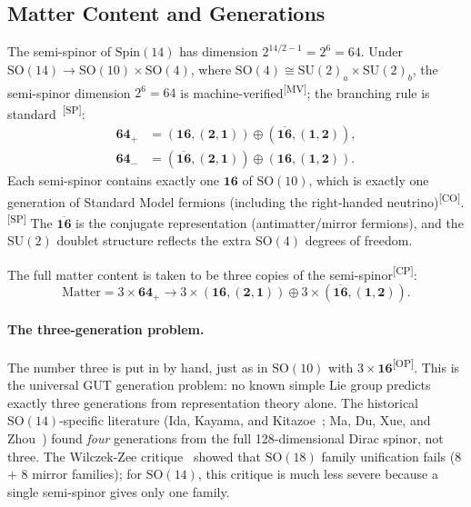 \documentclass[aps,prd,twocolumn,showpacs,preprintnumbers,superscriptaddress,floatfix]{revtex4-2}
\newcommand{\MV}{\textsuperscript{[MV]}}
\newcommand{\CO}{\textsuperscript{[CO]}}
\newcommand{\CP}{\textsuperscript{[CP]}}
\newcommand{\SP}{\textsuperscript{[SP]}}
\newcommand{\OP}{\textsuperscript{[OP]}}
\begin{document}
\subsection{Matter Content and Generations}
\label{sec:matter}

The semi-spinor of $\mathrm{Spin}(14)$ has dimension
$2^{14/2-1} = 2^6 = 64$.  Under $\mathrm{SO}(14) \to \mathrm{SO}(10)
\times \mathrm{SO}(4)$, where $\mathrm{SO}(4) \cong \mathrm{SU}(2)_a
\times \mathrm{SU}(2)_b$, the semi-spinor dimension
$2^6 = 64$ is machine-verified\MV; the branching rule is
standard~\cite{slansky1981}\SP:
\begin{align}\label{eq:64}
  \mathbf{64}_+ &= (\mathbf{16}, (\mathbf{2}, \mathbf{1}))
    \oplus (\overline{\mathbf{16}}, (\mathbf{1}, \mathbf{2})), \\
  \mathbf{64}_- &= (\overline{\mathbf{16}}, (\mathbf{2}, \mathbf{1}))
    \oplus (\mathbf{16}, (\mathbf{1}, \mathbf{2})).
\end{align}
Each semi-spinor contains exactly one $\mathbf{16}$ of $\mathrm{SO}(10)$,
which is exactly one generation of Standard Model fermions (including
the right-handed neutrino)\CO.\SP{}  The $\overline{\mathbf{16}}$ is
the conjugate representation (antimatter/mirror fermions), and the
$\mathrm{SU}(2)$ doublet structure reflects the extra $\mathrm{SO}(4)$
degrees of freedom.

The full matter content is taken to be three copies of the
semi-spinor\CP:
\begin{equation}\label{eq:matter}
  \text{Matter} = 3 \times \mathbf{64}_+
    \to 3 \times (\mathbf{16}, (\mathbf{2}, \mathbf{1}))
    \oplus 3 \times (\overline{\mathbf{16}}, (\mathbf{1}, \mathbf{2})).
\end{equation}

\paragraph{The three-generation problem.}
The number three is put in by hand, just as in $\mathrm{SO}(10)$
with $3 \times \mathbf{16}$\OP.  This is the universal GUT generation
problem: no known simple Lie group predicts exactly three generations
from representation theory alone.  The historical
$\mathrm{SO}(14)$-specific literature (Ida, Kayama, and
Kitazoe~\cite{ida1980}; Ma, Du, Xue, and Zhou~\cite{ma1981}) found
\emph{four} generations from the full 128-dimensional Dirac spinor, not
three.  The Wilczek-Zee critique~\cite{wilczek1982} showed that
$\mathrm{SO}(18)$ family unification fails (8 + 8 mirror families);
for $\mathrm{SO}(14)$, this critique is much less severe because a single
semi-spinor gives only one family.
\end{document}
